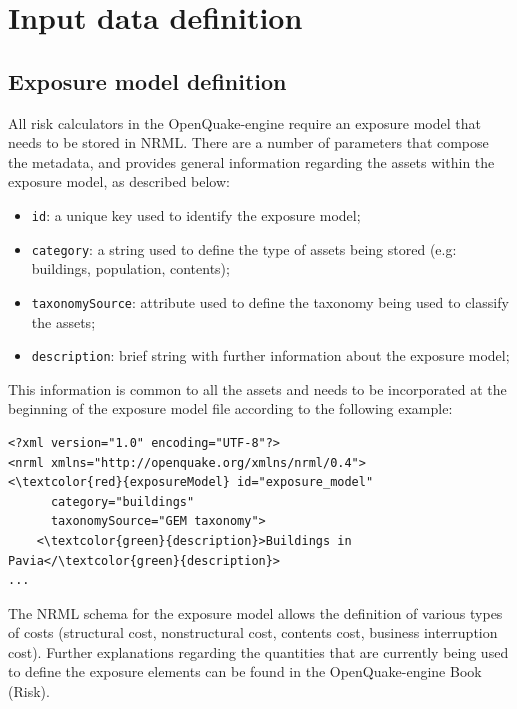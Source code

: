 \section{Input data definition}
\subsection{Exposure model definition}
All risk calculators in the OpenQuake-engine require an \gls{exposure model} that needs to be stored in NRML. There are a number of parameters that compose the metadata, and provides general information regarding the \glspl{asset} within the \gls{exposure model}, as described below:

\begin{itemize}
\item  \Verb+id+: a unique key used to identify the \gls{exposure model};
\item  \Verb+category+: a string used to define the type of \glspl{asset} being stored (e.g: buildings, population, contents);
\item  \Verb+taxonomySource+: attribute used to define the \gls{taxonomy} being used to classify the  \glspl{asset};
\item  \Verb+description+: brief string with further information about the \gls{exposure model};
\end{itemize}

This information is common to all the assets and needs to be incorporated at the beginning of the exposure model file according to the following example:

\begin{Verbatim}[frame=single, commandchars=\\\{\}, samepage=false]
<?xml version="1.0" encoding="UTF-8"?>
<nrml xmlns="http://openquake.org/xmlns/nrml/0.4">
<\textcolor{red}{exposureModel} id="exposure_model"
      category="buildings"
      taxonomySource="GEM taxonomy">
    <\textcolor{green}{description}>Buildings in Pavia</\textcolor{green}{description}>
...
\end{Verbatim}

The NRML schema for the exposure model allows the definition of various types of costs (structural cost, nonstructural cost, contents cost, business interruption cost). Further explanations regarding the quantities that are currently being used to define the exposure elements can be found in the OpenQuake-engine Book (Risk).


